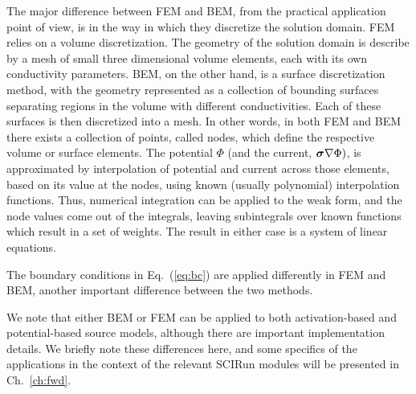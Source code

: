 The major difference between FEM and BEM, from the practical application point of view,
is in the way in which they discretize the solution domain.
FEM relies on a volume discretization. The geometry of the solution domain
is describe by a mesh of small three dimensional volume elements,
each with its own conductivity parameters.
BEM, on the other hand, is a surface discretization
method, with the geometry represented as a collection of bounding surfaces
separating regions in the volume with different conductivities. Each of
these surfaces is then discretized into a mesh. In other words, in both FEM
and BEM there exists a collection of points, called nodes, which define the
respective volume or surface elements. The potential $\Phi$ (and the
current, $\mbox{\boldmath $\sigma$} \nabla \Phi)$, is approximated by interpolation of
potential and current across those elements, based on its value at the
nodes, using known (usually polynomial) interpolation functions. Thus,
numerical integration can be applied to the weak form, and the node values
come out of the integrals, leaving subintegrals over known functions which
result in a set of weights. The result in either case is a system of
linear equations.

The boundary conditions in Eq.~(\ref{eq:bc}) are applied differently  in FEM
and BEM, another important difference between the two methods.



We note that either BEM or FEM can be applied to both activation-based and
potential-based source models, although there are important implementation
details. We briefly note these differences here, and some specifics of the
applications in the context of the relevant SCIRun modules will be
presented in Ch.~\ref{ch:fwd}.



